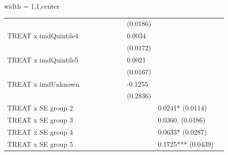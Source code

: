\begin{table}[H]
\begin{adjustbox}{width = 1.1\textwidth,center}
\begin{tabular}{llllllllll}
        &&&&&&& (0.0186) && \\
 TREAT x imdQuintile4                                                                                                                          &                    &                     &                    &                     &                    &                    & 0.0034   &                    &                    \\
        &&&&&&& (0.0172) & \\
 TREAT x imdQuintile5                                                                                                                          &                    &                     &                    &                     &                    &                    &  0.0021  &                    &                    \\
        &&&&&&&  (0.0167)  &\\
 TREAT x imdUnknown                                                                                                                            &                    &                     &                    &                     &                    &                    & -0.1255   &                    &                    \\
        &&&&&&&  (0.2836) & \\
 TREAT x SE group 2                                                                                                         &                    &                     &                    &                     &                    &                    &                    & 0.0241* (0.0114)   &                    \\
 TREAT x SE group 3                                                                                                         &                    &                     &                    &                     &                    &                    &                    & 0.0360. (0.0186)   &                    \\
 TREAT x SE group 4                                                                                                         &                    &                     &                    &                     &                    &                    &                    & 0.0633* (0.0287)   &                    \\
 TREAT x SE group 5                                                                                                         &                    &                     &                    &                     &                    &                    &                    & 0.1725*** (0.0439) &                    \\

\end{tabular}
\end{adjustbox}
\end{table}
